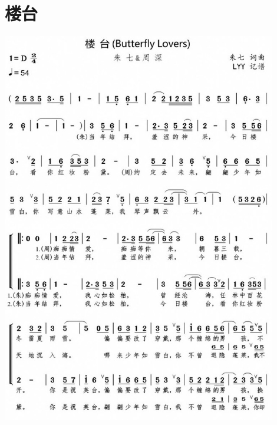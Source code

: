 \documentclass[cn,pad,twocol]{elegantbook}
\begin{document}
\section{楼台}      \includegraphics[width=0.9\textwidth]{dongxiao/20200901-楼台.jpeg}
\end{document}
